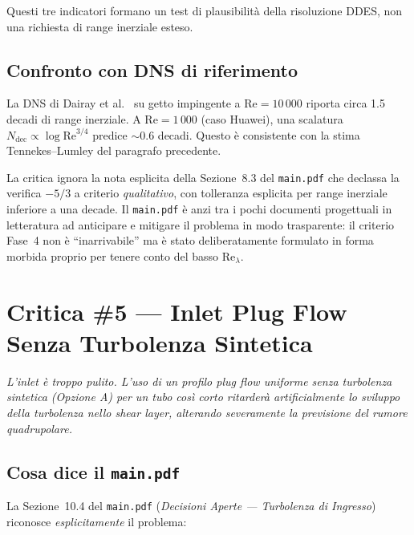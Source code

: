 \documentclass[11pt,a4paper]{article}
\newcommand{\Rey}{\mathrm{Re}}
\begin{document}
Questi tre indicatori formano un test di plausibilità della
risoluzione DDES, non una richiesta di range inerziale esteso.

\subsection{Confronto con DNS di riferimento}

La DNS di Dairay et al.~\cite{Dairay2015} su getto impingente a
$\Rey=10\,000$ riporta circa 1.5 decadi di range inerziale. A
$\Rey=1\,000$ (caso Huawei), una scalatura
$N_{\mathrm{dec}}\propto \log\Rey^{3/4}$ predice
$\sim 0.6$ decadi. Questo è consistente con la stima
Tennekes--Lumley del paragrafo precedente.

\begin{verdettofalsa}
La critica ignora la nota esplicita della Sezione~8.3 del
\texttt{main.pdf} che declassa la verifica $-5/3$ a criterio
\emph{qualitativo}, con tolleranza esplicita per range inerziale
inferiore a una decade. Il \texttt{main.pdf} è anzi tra i pochi
documenti progettuali in letteratura ad anticipare e mitigare il
problema in modo trasparente: il criterio Fase~4 non è ``inarrivabile''
ma è stato deliberatamente formulato in forma morbida proprio per
tenere conto del basso $\Rey_{\lambda}$.
\end{verdettofalsa}

\section{Critica \#5 — Inlet Plug Flow Senza Turbolenza Sintetica}
\label{sec:c5}

\begin{citazione}
\textit{L'inlet è troppo pulito. L'uso di un profilo plug flow
uniforme senza turbolenza sintetica (Opzione A) per un tubo così
corto ritarderà artificialmente lo sviluppo della turbolenza nello
shear layer, alterando severamente la previsione del rumore
quadrupolare.}
\end{citazione}

\subsection{Cosa dice il \texttt{main.pdf}}

La Sezione~10.4 del \texttt{main.pdf} (\emph{Decisioni Aperte ---
Turbolenza di Ingresso}) riconosce \emph{esplicitamente} il problema:
\end{document}
